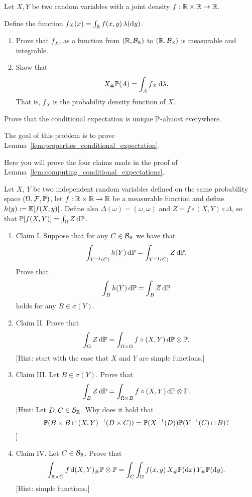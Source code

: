 \begin{problem}\label{prb:joint_pdfs}
Let $X,Y$ be two random variables with a joint density $f : \mathbb R \times \mathbb R \to \mathbb R$. 

Define the function $f_X(x) = \int_{\mathbb R} f(x,y) \, \lambda(\mathrm{d} y)$.
\begin{enumerate}[label={(\alph*)}]
\item Prove that $f_X$, as a function from $(\mathbb R, \mathcal B_{\mathbb R})$ to $(\mathbb R, \mathcal B_{\mathbb R})$ is measurable and integrable.
\item Show that
\[
	X_\# \mathbb P (A) = \int_A f_X \, \mathrm{d} \lambda.
\]
That is, $f_X$ is the probability density function of $X$.
\end{enumerate}
\end{problem}

\begin{problem}
Prove that the conditional expectation is unique $\mathbb P$-almost everywhere.
\end{problem}

\begin{problem}\label{prb:properties_conditional_expectation}
The goal of this problem is to prove Lemma~\ref{lem:properties_conditional_expectation}.
\end{problem}

\begin{problem}\label{prb:computing_conditional_expectations}
Here you will prove the four claims made in the proof of Lemma~\ref{lem:computing_conditional_expectations}.

Let $X$, $Y$ be two independent random variables defined on the same probability space $(\Omega, \mathcal F, \mathbb P)$, let $f : \mathbb R \times \mathbb R \to \mathbb R$ be a measurable function and define $h(y) := \mathbb E[f(X,y)]$. Define also $\Delta(\omega) = (\omega, \omega)$ and $Z = f \circ (X, Y) \circ \Delta$, so that $\mathbb P[f(X,Y)] = \int_\Omega Z \, \mathrm{d} \mathbb P$.

\begin{enumerate}[label={(\alph*)}]
\item Claim I. Suppose that for any $C \in \mathcal B_{\mathbb R}$ we have that
\[
	\int_{Y^{-1}(C)} h(Y) \, \mathrm{d} \mathbb P = \int_{Y^{-1}(C)} Z \, \mathrm{d} \mathbb P.
\]
Prove that
\[
	\int_B h(Y) \, \mathrm{d} \mathbb P = \int_B Z \, \mathrm{d} \mathbb P
\]
holds for any $B \in \sigma(Y)$.
\item Claim II. Prove that
\[
	\int_\Omega Z \, \mathrm{d} \mathbb P = \int_{\Omega \times \Omega} f \circ (X,Y) \, \mathrm{d} \mathbb P \otimes \mathbb P.
\]
[Hint: start with the case that $X$ and $Y$ are simple functions.]
\item Claim III. Let $B \in \sigma(Y)$. Prove that
\[
	\int_{B} Z \, \mathrm{d} \mathbb P = \int_{\Omega \times B} f \circ (X,Y) \, \mathrm{d} \mathbb P \otimes \mathbb P.
\]
[Hint: Let $D, C \in \mathcal B_{\mathbb R}$. Why does it hold that 
\[
	\mathbb P(B \times B \cap (X,Y)^{-1}(D \times C)) = \mathbb P(X^{-1}(D))\mathbb P(Y^{-1}(C) \cap B)?
\]
]
\item Claim IV. Let $C \in \mathcal B_{\mathbb R}$. Prove that
\[
	\int_{\mathbb R \times C} f \, \mathrm{d} (X,Y)_\# \mathbb P \otimes \mathbb P
	= \int_C \int_\Omega f(x,y) \, X_\#\mathbb P(\mathrm{d} x) \, Y_\# \mathbb P (\mathrm{d} y).
\]
[Hint: simple functions.]
\end{enumerate}
\end{problem}

